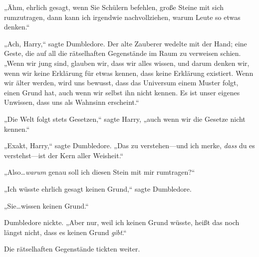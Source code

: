 „Ähm, ehrlich gesagt, wenn Sie Schülern befehlen, große Steine mit sich rumzutragen, dann kann ich irgendwie nachvollziehen, warum Leute so etwas denken.“

„Ach, Harry,“ sagte Dumbledore. Der alte Zauberer wedelte mit der Hand; eine Geste, die auf all die rätselhaften Gegenstände im Raum zu verweisen schien. „Wenn wir jung sind, glauben wir, dass wir alles wissen, und darum denken wir, wenn wir keine Erklärung für etwas kennen, dass keine Erklärung existiert. Wenn wir älter werden, wird uns bewusst, dass das Universum einem Muster folgt, einen Grund hat, auch wenn wir selbst ihn nicht kennen. Es ist unser eigenes Unwissen, dass uns als Wahnsinn erscheint.“

„Die Welt folgt stets Gesetzen,“ sagte Harry, „auch wenn wir die Gesetze nicht kennen.“

„Exakt, Harry,“ sagte Dumbledore. „Das zu verstehen—und ich merke, \emph{dass} du es verstehst—ist der Kern aller Weisheit.“

„Also…\emph{warum} genau soll ich diesen Stein mit mir rumtragen?“

„Ich wüsste ehrlich gesagt keinen Grund,“ sagte Dumbledore.

„Sie…wissen keinen Grund.“

Dumbledore nickte. „Aber nur, weil ich keinen Grund wüsste, heißt das noch längst nicht, dass es keinen Grund \emph{gibt}.“

Die rätselhaften Gegenstände tickten weiter.

